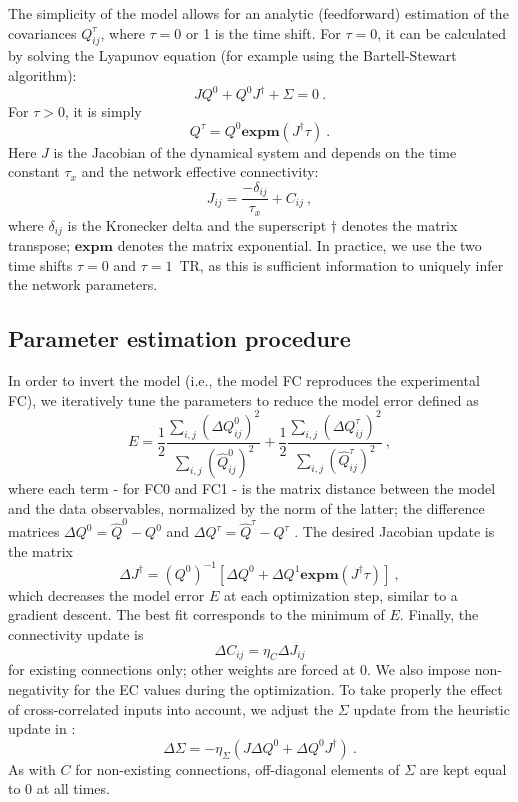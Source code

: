 \documentclass{article}
\newcommand{\expm}{\mathbf{expm}}
\newcommand{\transp}{\dag}
\begin{document}
The simplicity of the model allows for an analytic (feedforward) estimation of the covariances $Q^\tau_{ij}$, where $\tau = 0$ or 1 is the time shift.
For $\tau = 0$, it can be calculated by solving the Lyapunov equation (for example using the Bartell-Stewart algorithm): 
\begin{equation}
J Q^0 + Q^0 J^\transp + \Sigma = 0
\ .
\end{equation}
For $\tau > 0$, it is simply
\begin{equation}
Q^\tau = Q^0 \expm(J^\transp \tau)
\ .
\end{equation}
Here $J$ is the Jacobian of the dynamical system and depends on the time constant $\tau_x$ and the network effective connectivity: 
\begin{equation}
J_{ij} = \frac{-\delta_{ij}}{\tau_x} + C_{ij}
\ ,
\end{equation}
where $\delta_{ij}$ is the Kronecker delta and the superscript $\transp$ denotes the matrix transpose;  $\expm$ denotes the matrix exponential. 
In practice, we use the two time shifts $\tau = 0$ and $\tau = 1$~TR, as this is sufficient information to uniquely infer the network parameters.

\subsection{Parameter estimation procedure}

In order to invert the model (i.e., the model FC reproduces the experimental FC), we iteratively tune the parameters to reduce the model error defined as 
\begin{equation} \label{eq_error_mod}
E = \frac{1}{2} \frac{\sum_{i,j} (\Delta Q^0_{ij})^2}{\sum_{i,j} (\hat{Q}^0_{ij})^2} + \frac{1}{2} \frac{\sum_{i,j} (\Delta Q^\tau_{ij})^2}{\sum_{i,j} (\hat{Q}^\tau_{ij})^2} \ , 
\end{equation}
where each term - for FC0 and FC1 - is the matrix distance between the model and the data observables, normalized by the norm of the latter; the difference matrices $\Delta Q^0 = \widehat{Q}^0 - Q^0$ and $\Delta Q^\tau = \widehat{Q}^\tau - Q^\tau$ .
The desired Jacobian update is the matrix
\begin{equation}
\Delta J^\transp = (Q^0)^{-1} [\Delta Q^0 + \Delta Q^1 \expm(J^\transp \tau)]
\ ,
\end{equation}
which decreases the model error $E$ at each optimization step, similar to a gradient descent. The best fit corresponds to the minimum of $E$. Finally, the connectivity update is
\begin{equation}
\Delta C_{ij} = \eta_C \Delta J_{ij}
\end{equation}
for existing connections only; other weights are forced at 0. We also impose non-negativity for the EC values during the optimization. 
To take properly the effect of cross-correlated inputs into account, we adjust the $\Sigma$ update from the heuristic update in \cite{Gilson_PCB_2016}:
\begin{equation}
\Delta \Sigma = - \eta_\Sigma (J \Delta Q^0 + \Delta Q^0 J^\transp)
\ .
\end{equation}
As with $C$ for non-existing connections, off-diagonal elements of $\Sigma$ are kept equal to 0 at all times.
\end{document}
